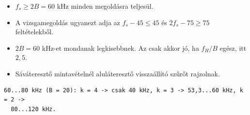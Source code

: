 \begin{center}\end{center}
\begin{eredmeny}

\begin{center}\end{center}
\end{eredmeny}
\begin{tipp}[Ellenőrzés]
\begin{itemize}
\item $f_s\ge2B=60$ kHz minden megoldásra teljesül.
\item A vizsgamegoldás ugyanezt adja az $f_s-45\le45$ és $2f_s-75\ge75$ feltételekből.
\end{itemize}
\end{tipp}
\begin{figyelem}
\begin{itemize}
\item $2B=60$ kHz-et mondanak legkisebbnek. Az csak akkor jó, ha $f_H/B$ egész, itt $2{,}5$.
\item Sáváteresztő mintavételnél aluláteresztő visszaállító szűrőt rajzolnak.
\end{itemize}
\end{figyelem}
\begin{tipp}
\small
\begin{verbatim}
60...80 kHz (B = 20): k = 4 -> csak 40 kHz, k = 3 -> 53,3...60 kHz, k = 2 ->
  80...120 kHz.
\end{verbatim}
\end{tipp}


